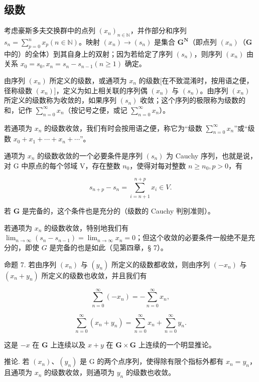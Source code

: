 \subsection{级数}

考虑豪斯多夫交换群中的点列 \((x_{n})_{n\in \mathbb{N}}\)，并作部分和序列 \(s_n = \sum_{p=0}^{n} x_p (n \in \mathbb{N})\)。映射 \((x_{n}) \to (s_{n})\) 是集合 \(\mathbf{G}^{\mathbf{N}}\)（即点列 \((x_{n})\)（\(\mathbf{G}\) 中的）的全体）到其自身上的双射；因为若给定了序列 \((s_{n})\)，则序列 \((x_{n})\) 由关系 \(x_{0} = s_{0}, x_{n} = s_{n}-s_{n-1} (n \geqslant 1)\) 确定。

由序列 \((x_{n})\) 所定义的级数，或通项为 \(x_{n}\) 的级数{[}在不致混淆时，按用语之便，径称级数 \((x_{n})\){]}，定义为如上相关联的序列偶 \((x_{n})\) 与 \((s_{n})\)。由序列 \((x_{n})\) 所定义的级数称为收敛的，如果序列 \((s_n)\) 收敛；这个序列的极限称为级数的和，记作 \(\sum_{n=0}^{\infty} x_n\)（按记号之便，或记 \(\sum_{n=0}^{\infty} x_n\)）。

若通项为 \(x_{n}\) 的级数收敛，我们有时会按用语之便，称它为“级数 \(\sum_{n=0}^{\infty} x_{n}\)”或“级数 \(x_{0} + x_{1} + \cdots + x_{n} + \cdots\)”。

通项为 \(x_{n}\) 的级数收敛的一个必要条件是序列 \((s_{n})\) 为 Cauchy 序列，也就是说，对 G 中原点的每个邻域 V，存在整数 \(n_{0}\)，使得对每对整数 \(n \geqslant n_{0}, p > 0\)，有

\[
s _ {n + p} - s _ {n} = \sum_ {i = n + 1} ^ {n + p} x _ {i} \in V.
\]

若 \(\mathbf{G}\) 是完备的，这个条件也是充分的（级数的 Cauchy 判别准则）。

若通项为 \(x_{n}\) 的级数收敛，特别地我们有 \(\lim_{n\to \infty}(s_n - s_{n-1}) = \lim_{n\to \infty}x_n = 0\)；但这个收敛的必要条件一般绝不是充分的，即使 \(G\) 是完备的也是如此（见第四章，§ 7）。

命题 7. 若由序列 \((x_{n})\) 与 \((y_{n})\) 所定义的级数都收敛，则由序列 \((-x_{n})\) 与 \((x_{n} + y_{n})\) 所定义的级数也收敛，并且我们有

\[
\sum_ {n = 0} ^ {\infty} (- x _ {n}) = - \sum_ {n = 0} ^ {\infty} x _ {n},\tag{7}
\]

\[
\sum_ {n = 0} ^ {\infty} \left(x _ {n} + y _ {n}\right) = \sum_ {n = 0} ^ {\infty} x _ {n} + \sum_ {n = 0} ^ {\infty} y _ {n}.\tag{8}
\]

这是 \(-x\) 在 \(\mathbf{G}\) 上连续以及 \(x + y\) 在 \(\mathbf{G} \times \mathbf{G}\) 上连续的一个明显推论。

推论. 若 \((x_{n})\)、\((y_{n})\) 是 G 的两个点序列，使得除有限个指标外都有 \(x_{n}=y_{n}\)，且通项为 \(x_{n}\) 的级数收敛，则通项为 \(y_{n}\) 的级数也收敛。

